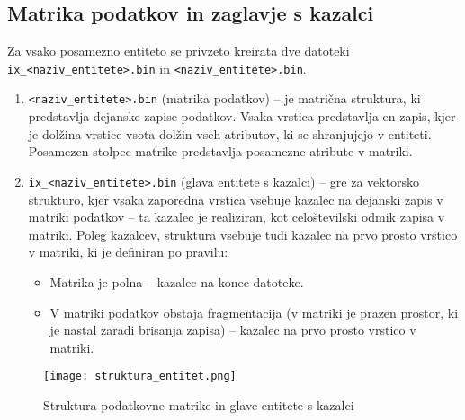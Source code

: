 \documentclass[a4paper,12pt,openright]{book}
\begin{document}
        \subsection{Matrika podatkov in zaglavje s kazalci}
        Za vsako posamezno entiteto se privzeto kreirata dve datoteki {\tt ix\_<naziv\_entitete>.bin} in {\tt <naziv\_entitete>.bin}.
        \begin{enumerate}
            \item {\tt <naziv\_entitete>.bin} (matrika podatkov) – je matrična struktura, ki predstavlja dejanske zapise podatkov. Vsaka vrstica predstavlja en zapis, kjer je dolžina vrstice vsota dolžin vseh atributov, ki se shranjujejo v entiteti. Posamezen stolpec matrike predstavlja posamezne atribute v matriki.
            \item {\tt ix\_<naziv\_entitete>.bin} (glava entitete s kazalci) – gre za vektorsko strukturo, kjer vsaka zaporedna vrstica vsebuje kazalec na dejanski zapis v matriki podatkov – ta kazalec je realiziran, kot celoštevilski odmik zapisa v matriki. Poleg kazalcev, struktura vsebuje tudi kazalec na prvo prosto vrstico v matriki, ki je definiran po pravilu:
            \begin{itemize}
                \item Matrika je polna – kazalec na konec datoteke.
                \item V matriki podatkov obstaja fragmentacija (v matriki je prazen prostor, ki je nastal zaradi brisanja zapisa) – kazalec na prvo prosto vrstico v matriki.
            \end{itemize}
        \end{enumerate}

        \begin{figure}[h]
            \centerline{\texttt{[image: struktura\_entitet.png]}}
            \caption{Struktura podatkovne matrike in glave entitete s kazalci}
            \label{sl:mindmap}
        \end{figure}
        
\end{document}
